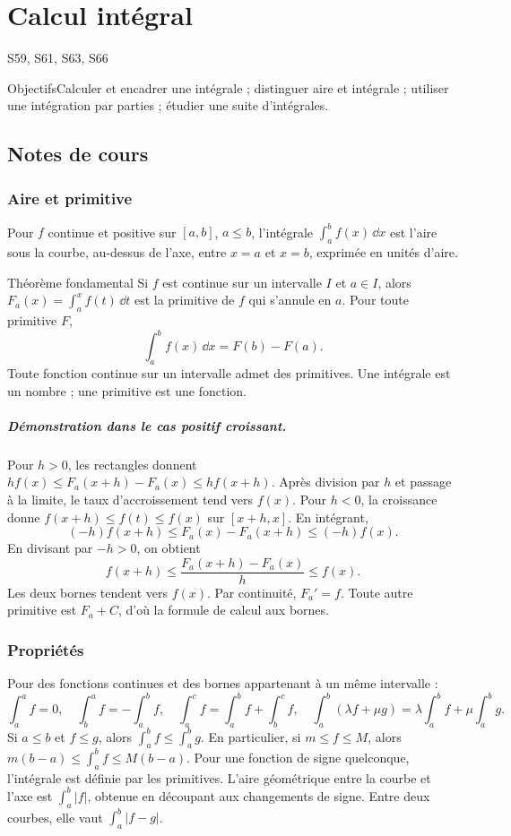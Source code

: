 \setcounter{chapter}{7}\chapter{Calcul intégral}\label{ch:8}

{\small\sffamily\color{teal}S59, S61, S63, S66\par}

\begin{retenir}{Objectifs}Calculer et encadrer une intégrale ; distinguer aire et intégrale ; utiliser une intégration par parties ; étudier une suite d'intégrales.\end{retenir}

\section{Notes de cours}
\subsection{Aire et primitive}
Pour $f$ continue et positive sur $[a,b]$, $a\le b$, l'intégrale $\int_a^b f(x)\,\dd x$ est l'aire sous la courbe, au-dessus de l'axe, entre $x=a$ et $x=b$, exprimée en unités d'aire.
\begin{retenir}{Théorème fondamental}
Si $f$ est continue sur un intervalle $I$ et $a\in I$, alors $F_a(x)=\int_a^x f(t)\,\dd t$ est la primitive de $f$ qui s'annule en $a$. Pour toute primitive $F$,
\[\int_a^b f(x)\,\dd x=F(b)-F(a).\]
Toute fonction continue sur un intervalle admet des primitives. Une intégrale est un nombre ; une primitive est une fonction.
\end{retenir}
\paragraph{Démonstration dans le cas positif croissant.} Pour $h>0$, les rectangles donnent $hf(x)\le F_a(x+h)-F_a(x)\le hf(x+h)$. Après division par $h$ et passage à la limite, le taux d'accroissement tend vers $f(x)$. Pour $h<0$, la croissance donne $f(x+h)\le f(t)\le f(x)$ sur $[x+h,x]$. En intégrant,
\[(-h)f(x+h)\le F_a(x)-F_a(x+h)\le(-h)f(x).\]
En divisant par $-h>0$, on obtient
\[f(x+h)\le\frac{F_a(x+h)-F_a(x)}h\le f(x).\]
Les deux bornes tendent vers $f(x)$. Par continuité, $F_a'=f$. Toute autre primitive est $F_a+C$, d'où la formule de calcul aux bornes.
\subsection{Propriétés}
Pour des fonctions continues et des bornes appartenant à un même intervalle :
\[\int_a^a f=0,\quad\int_b^a f=-\int_a^b f,\quad
\int_a^c f=\int_a^b f+\int_b^c f,\quad
\int_a^b(\lambda f+\mu g)=\lambda\int_a^b f+\mu\int_a^b g.\]
Si $a\le b$ et $f\le g$, alors $\int_a^b f\le\int_a^b g$. En particulier, si $m\le f\le M$, alors $m(b-a)\le\int_a^b f\le M(b-a)$.
Pour une fonction de signe quelconque, l'intégrale est définie par les primitives. L'aire géométrique entre la courbe et l'axe est $\int_a^b|f|$, obtenue en découpant aux changements de signe. Entre deux courbes, elle vaut $\int_a^b|f-g|$.
